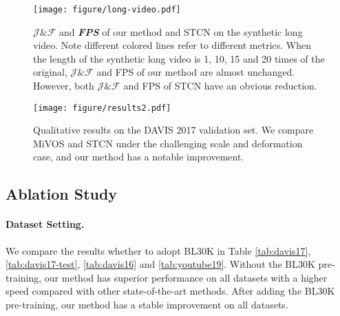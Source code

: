 \documentclass[10pt,twocolumn,letterpaper]{article}
\begin{document}
\begin{figure}[t]
\centering \texttt{[image: figure/long-video.pdf]}
\vspace{-1.5em}
\caption{
\textcolor[RGB]{70, 130, 180}{$\bm{\mathcal{J}\&\mathcal{F}}$} and  \textcolor[RGB]{255, 0, 0}{\textbf{\textit{FPS}}} of our method and STCN \cite{cheng2021rethinking} on the synthetic long video. Note different colored lines refer to different metrics. When the length of the synthetic long video is 1, 10, 15 and 20 times of the original, $\mathcal{J}\&\mathcal{F}$ and FPS of our method are almost unchanged. However, both $\mathcal{J}\&\mathcal{F}$ and FPS of STCN have an obvious reduction.}
\label{fig:long-video}
\vspace{-1em}
\end{figure}
\begin{figure*}[t]
\centering
\texttt{[image: figure/results2.pdf]}
\caption{Qualitative results on the DAVIS 2017 validation set. We compare MiVOS \cite{cheng2021modular} and STCN \cite{cheng2021rethinking} under the challenging scale and deformation case, and our method has a notable improvement.}
\label{fig:results}
\vspace{-1.3em}
\end{figure*}
\subsection{Ablation Study}
\paragraph{Dataset Setting.}
We compare the results whether to adopt BL30K \cite{cheng2021modular} in Table \ref{tab:davis17}, \ref{tab:davis17-test}, \ref{tab:davis16} and \ref{tab:youtube19}. Without the BL30K pre-training, our method has superior performance on all datasets with a higher speed compared with other state-of-the-art methods. After adding the BL30K pre-training, our method has a stable improvement on all datasets.
\end{document}
